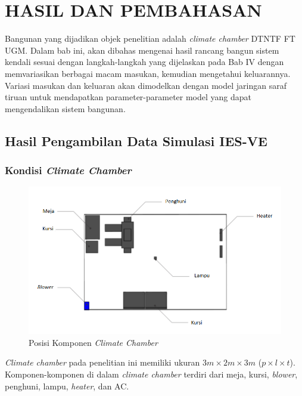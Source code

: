 \chapter{HASIL DAN PEMBAHASAN}
\label{hasil-dan-pembahasan}
Bangunan yang dijadikan objek penelitian adalah \textit{climate chamber} DTNTF FT UGM. Dalam bab ini, akan dibahas mengenai hasil rancang bangun sistem kendali sesuai dengan langkah-langkah yang dijelaskan pada Bab IV dengan memvariasikan berbagai macam masukan, kemudian mengetahui keluarannya. Variasi masukan dan keluaran akan dimodelkan dengan model jaringan saraf tiruan untuk mendapatkan parameter-parameter model yang dapat mengendalikan sistem bangunan.

\section{Hasil Pengambilan Data Simulasi IES-VE}

\subsection{Kondisi \textit{Climate Chamber}}
\begin{figure}[!h]
	\centering
	\includegraphics[width=1\textwidth]{figures/KondisiChamber}
	\caption{Posisi Komponen \textit{Climate Chamber}}
	\label{fig:5:KondisiChamber}
\end{figure}

\textit{Climate chamber} pada penelitian ini memiliki ukuran $3m \times 2m \times 3m$ ($p \times l \times t$). Komponen-komponen di dalam \textit{climate chamber} terdiri dari meja, kursi, \textit{blower}, penghuni, lampu, \textit{heater}, dan AC. 

